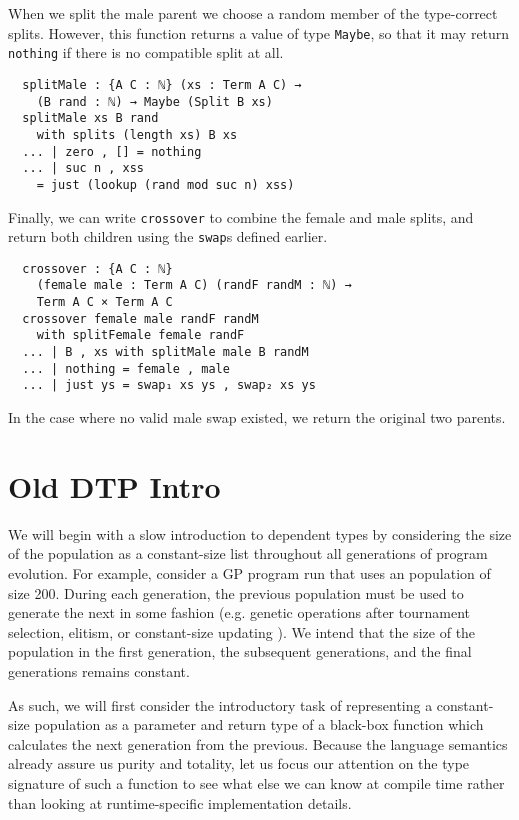 \documentclass{acm_proc_article-sp}
\begin{document}

When we split the male parent we choose a random member of the
type-correct splits. However, this function returns a value of type
\texttt{Maybe}, so that it may return \texttt{nothing} if there is no
compatible split at all.

\begin{verbatim}
  splitMale : {A C : ℕ} (xs : Term A C) →
    (B rand : ℕ) → Maybe (Split B xs)
  splitMale xs B rand
    with splits (length xs) B xs
  ... | zero , [] = nothing
  ... | suc n , xss
    = just (lookup (rand mod suc n) xss)
\end{verbatim}

Finally, we can write \texttt{crossover} to combine the female and
male splits, and return both children using the \texttt{swap}s defined
earlier.

\begin{verbatim}
  crossover : {A C : ℕ}
    (female male : Term A C) (randF randM : ℕ) →
    Term A C × Term A C
  crossover female male randF randM
    with splitFemale female randF
  ... | B , xs with splitMale male B randM
  ... | nothing = female , male
  ... | just ys = swap₁ xs ys , swap₂ xs ys
\end{verbatim}

In the case where no valid male swap existed, we return the original
two parents.

\section{Old DTP Intro}

We will begin with a slow introduction to dependent types by
considering the size of the population as a constant-size list
throughout all generations of program evolution. For example, consider
a GP program run that uses an population of size 200. During each
generation, the previous population must be used to generate the next
in some fashion (e.g. genetic operations after tournament selection,
elitism, or constant-size updating \cite{montana:strongtree}). We
intend that the size of the population in the first generation, the
subsequent generations, and the final generations remains
constant.

As such, we will first consider the introductory task of representing
a constant-size population as a parameter and return type of a
black-box function which calculates the next generation from the
previous. Because the language semantics already assure us purity and
totality, let us focus our attention on the type signature of such a
function to see what else we can know at compile time rather than
looking at runtime-specific implementation details.
\end{document}
